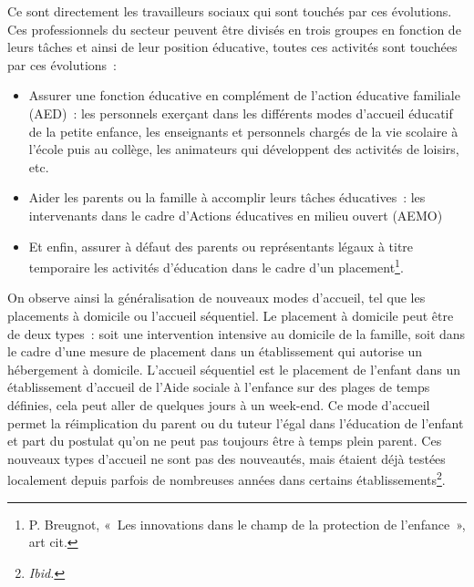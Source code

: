 \documentclass[
  12,
  a4paper,
]{report}
\begin{document}
Ce sont directement les travailleurs sociaux qui sont touchés par ces
évolutions. Ces professionnels du secteur peuvent être divisés en trois
groupes en fonction de leurs tâches et ainsi de leur position éducative,
toutes ces activités sont touchées par ces évolutions~:

\begin{itemize}
\item
  Assurer une fonction éducative en complément de l'action éducative
  familiale (AED)~: les personnels exerçant dans les différents modes
  d'accueil éducatif de la petite enfance, les enseignants et personnels
  chargés de la vie scolaire à l'école puis au collège, les animateurs
  qui développent des activités de loisirs, etc.
\item
  Aider les parents ou la famille à accomplir leurs tâches éducatives~:
  les intervenants dans le cadre d'Actions éducatives en milieu ouvert
  (AEMO)
\item
  Et enfin, assurer à défaut des parents ou représentants légaux à titre
  temporaire les activités d'éducation dans le cadre d'un
  placement\footnote{P. Breugnot, {«~Les innovations dans le champ de la
    protection de l'enfance~»}, art cit.}.
\end{itemize}

On observe ainsi la généralisation de nouveaux modes d'accueil, tel que
les placements à domicile ou l'accueil séquentiel. Le placement à
domicile peut être de deux types~: soit une intervention intensive au
domicile de la famille, soit dans le cadre d'une mesure de placement
dans un établissement qui autorise un hébergement à domicile. L'accueil
séquentiel est le placement de l'enfant dans un établissement d'accueil
de l'Aide sociale à l'enfance sur des plages de temps définies, cela
peut aller de quelques jours à un week-end. Ce mode d'accueil permet la
réimplication du parent ou du tuteur l'égal dans l'éducation de l'enfant
et part du postulat qu'on ne peut pas toujours être à temps plein
parent. Ces nouveaux types d'accueil ne sont pas des nouveautés, mais
étaient déjà testées localement depuis parfois de nombreuses années dans
certains établissements\footnote{\emph{Ibid.}}.
\end{document}
